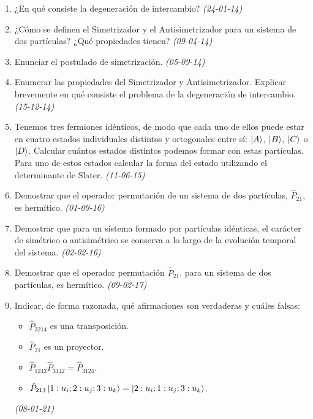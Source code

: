 \begin{enumerate}
    
    \item ¿En qué consiste la degeneración de intercambio? \textit{(24-01-14)}

    \item ¿Cómo se definen el Simetrizador y el Antisimetrizador para un sistema de dos partículas? ¿Qué propiedades tienen? \textit{(09-04-14)}

    \item Enunciar el postulado de simetrización. \textit{(05-09-14)}

    \item Enumerar las propiedades del Simetrizador y Antisimetrizador. Explicar brevemente en qué consiste el problema de la degeneración de intercambio. \textit{(15-12-14)}

    \item Tenemos tres fermiones idénticos, de modo que cada uno de ellos puede estar en cuatro estados individuales distintos y ortogonales entre sí: $\ket{A}$, $\ket{B}$, $\ket{C}$ o $\ket{D}$. Calcular cuántos estados distintos podemos formar con estas partículas. Para uno de estos estados calcular la forma del estado utilizando el determinante de Slater. \textit{(11-06-15)}

    \item Demostrar que el operador permutación de un sistema de dos partículas, $\hat{P}_{21}$, es hermítico. \textit{(01-09-16)}

    \item Demostrar que para un sistema formado por partículas idénticas, el carácter de simétrico o antisimétrico se conserva a lo largo de la evolución temporal del sistema. \textit{(02-02-16)}

    \item Demostrar que el operador permutación $\hat{P}_{21}$, para un sistema de dos partículas, es hermítico. \textit{(09-02-17)}

    \item Indicar, de forma razonada, qué afirmaciones son verdaderas y cuáles falsas:
    \begin{itemize}
        \item $\hat{P}_{3214}$ es una transposición.
        \item $\hat{P}_{21}$ es un proyector.
        \item $\hat{P}_{1243} \hat{P}_{3142} = \hat{P}_{3124}$.
        \item $\hat{P}_{213} \ket{1 : u_i; 2 : u_j; 3 : u_k} = \ket{2 : u_i; 1 : u_j; 3 : u_k}$.
    \end{itemize}
    \textit{(08-01-21)}


\end{enumerate}
